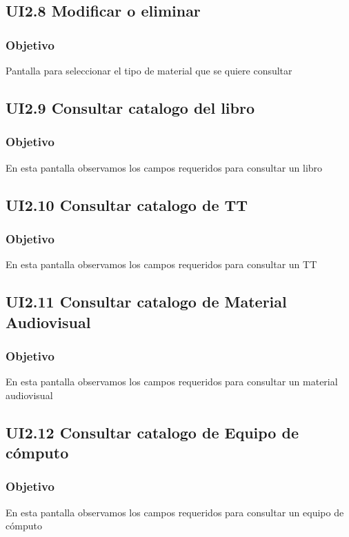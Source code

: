 \newpage
\subsection{UI2.8 Modificar o eliminar}

\subsubsection{Objetivo}
	Pantalla para seleccionar el tipo de material que se quiere consultar



\newpage
\subsection{UI2.9 Consultar catalogo del libro}

\subsubsection{Objetivo}
	En esta pantalla observamos los campos requeridos para consultar un libro



\newpage
\subsection{UI2.10 Consultar catalogo de TT}

\subsubsection{Objetivo}
	En esta pantalla observamos los campos requeridos para consultar un TT


\newpage
\subsection{UI2.11 Consultar catalogo de Material Audiovisual}

\subsubsection{Objetivo}
	En esta pantalla observamos los campos requeridos para consultar un material audiovisual


\newpage
\subsection{UI2.12 Consultar catalogo de Equipo de cómputo}

\subsubsection{Objetivo}
	En esta pantalla observamos los campos requeridos para consultar un equipo de cómputo

